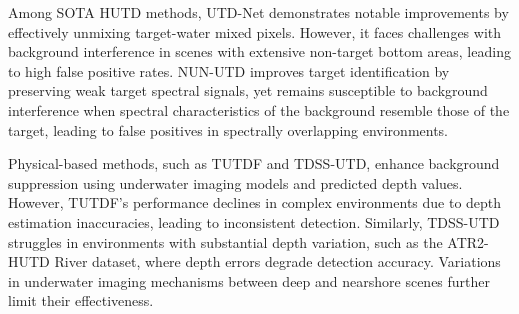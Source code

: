 Among SOTA HUTD methods, UTD-Net demonstrates notable improvements by effectively unmixing target-water mixed pixels. However, it faces challenges with background interference in scenes with extensive non-target bottom areas, leading to high false positive rates. NUN-UTD improves target identification by preserving weak target spectral signals, yet remains susceptible to background interference when spectral characteristics of the background resemble those of the target, leading to false positives in spectrally overlapping environments.

Physical-based methods, such as TUTDF and TDSS-UTD, enhance background suppression using underwater imaging models and predicted depth values. However, TUTDF's performance declines in complex environments due to depth estimation inaccuracies, leading to inconsistent detection. Similarly, TDSS-UTD struggles in environments with substantial depth variation, such as the ATR2-HUTD River dataset, where depth errors degrade detection accuracy. Variations in underwater imaging mechanisms between deep and nearshore scenes further limit their effectiveness.


